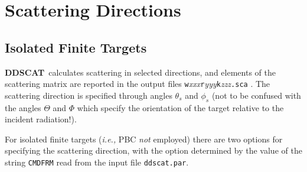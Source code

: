 

\section{Scattering Directions
\label{sec:scattering_directions}}

\subsection{ Isolated Finite Targets}


{{\bf DDSCAT}}\ calculates scattering in selected directions, and elements of
the scattering matrix are reported in the output 
files {\tt w}{\it xxx}{\tt r}{\it yyy}{\tt k}{\it zzz}{\tt .sca} .
The scattering direction is specified through angles $\theta_s$ and $\phi_s$ 
(not to be confused with the angles $\Theta$ and $\Phi$ which specify the 
orientation of the target relative to the incident radiation!).

For isolated finite targets ({\it i.e.,} PBC {\it not} employed) 
there are two options for specifying the scattering direction, with the
option determined by the value of the string {\tt CMDFRM} read from
the input file {\tt ddscat.par}.

